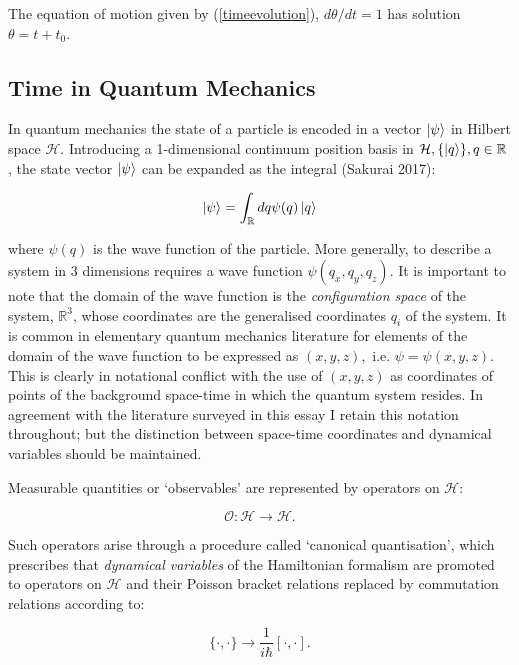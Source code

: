 \documentclass{article}
\begin{document}
\noindent The equation of motion given by (\ref{timeevolution}), $d\theta/dt=1$ has solution $\theta=t+t_0$.

\subsection{Time in Quantum Mechanics}
In quantum mechanics the state of a particle is encoded in a vector $\ket{\psi}$ in Hilbert space $\mathcal{H}$. Introducing a 1-dimensional continuum position basis in $\mathcal{H}, \{\ket{q}\}, q \in \mathbb{R}$, the state vector $\ket{\psi}$ can be expanded as the integral (Sakurai 2017):

\begin{equation}
	\ket{\psi} = \int_{\mathbb{R}}dq\psi(q)\ket{q}
\end{equation}

\noindent where $\psi(q)$ is the wave function of the particle. More generally, to describe a system in 3 dimensions requires a wave function $\psi(q_x,q_y,q_z)$. It is important to note that the domain of the wave function is the \textit{configuration space} of the system, $\mathbb{R}^3$, whose coordinates are the generalised coordinates $q_i$ of the system. It is common in elementary quantum mechanics literature for elements of the domain of the wave function to be expressed as $(x,y,z), \text{ i.e. } \psi = \psi(x,y,z)$. This is clearly in notational conflict with the use of $(x,y,z)$ as coordinates of points of the background space-time in which the quantum system resides. In agreement with the literature surveyed in this essay I retain this notation throughout; but the distinction between space-time coordinates and dynamical variables should be maintained.

Measurable quantities or `observables' are represented by operators on $\mathcal{H}$:

\begin{equation}
	\mathcal{O}: \mathcal{H} \rightarrow \mathcal{H}.
\end{equation}

\noindent Such operators arise through a procedure called `canonical quantisation', which prescribes that \textit{dynamical variables} of the Hamiltonian formalism are promoted to operators on $\mathcal{H}$ and their Poisson bracket relations replaced by commutation relations according to:

\begin{equation}
\{\cdot,\cdot\} \rightarrow \frac{1}{i\hbar}[\cdot,\cdot].
\end{equation}
\end{document}
